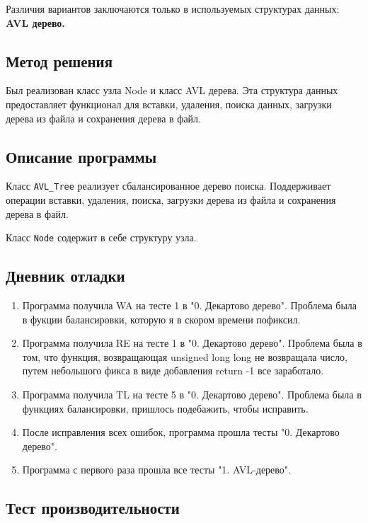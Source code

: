 \documentclass[12pt]{article}
\begin{document}
Различия вариантов заключаются только в используемых структурах данных:
\textbf{AVL дерево.}

\newpage
\subsection*{Метод решения}

Был реализован класс узла Node и класс AVL дерева. Эта структура данных предоставляет функционал для вставки, удаления, поиска данных, загрузки дерева из файла и сохранения дерева в файл.

\subsection*{Описание программы}

Класс \texttt{AVL\_Tree} реализует сбалансированное дерево поиска. Поддерживает операции вставки, удаления, поиска, загрузки дерева из файла и сохранения дерева в файл.

Класс \texttt{Node} содержит в себе структуру узла.


\newpage
\subsection*{Дневник отладки}

\begin{enumerate}
    \item Программа получила WA на тесте 1 в  "0. Декартово дерево". Проблема была в фукции балансировки, которую я в скором времени пофиксил.
    \item Программа получила RE на тесте 1 в  "0. Декартово дерево". Проблема была в том, что функция, возвращающая unsigned long long не возвращала число, путем небольшого фикса в виде добавления return -1 все заработало.
    \item Программа получила TL на тесте 5 в  "0. Декартово дерево". Проблема была в функциях балансировки, пришлось подебажить, чтобы исправить.
    \item После исправления всех ошибок, программа прошла тесты "0. Декартово дерево".
    \item Программа с первого раза прошла все тесты "1. AVL-дерево".
\end{enumerate}

\newpage
\subsection*{Тест производительности}
\end{document}
